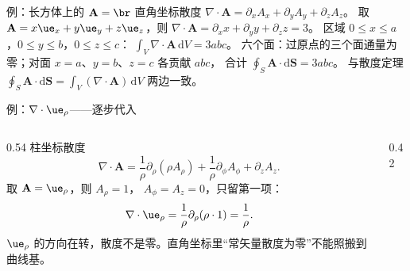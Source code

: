 \documentclass[fontset=windows, chinese, 10pt, xcolor=dvipsnames]{beamer}
\begin{document}
\begin{frame}{例：长方体上的 $\mathbf{A}=\br$}
  \small
  直角坐标散度
  $\nabla\cdot\mathbf{A}
  =\partial_x A_x+\partial_y A_y+\partial_z A_z$。
  取 $\mathbf{A}=x\ue_x+y\ue_y+z\ue_z$，则
  $\nabla\cdot\mathbf{A}
  =\partial_x x+\partial_y y+\partial_z z=3$。
  区域 $0\leq x\leq a$，$0\leq y\leq b$，$0\leq z\leq c$：
  $\int_V\nabla\cdot\mathbf{A}\,\mathrm{d}V=3abc$。
  六个面：过原点的三个面通量为零；对面 $x=a$、$y=b$、$z=c$ 各贡献 $abc$，
  合计 $\oint_S\mathbf{A}\cdot\mathrm{d}\mathbf{S}=3abc$。
  与散度定理
  $\oint_S\mathbf{A}\cdot\mathrm{d}\mathbf{S}
  =\int_V(\nabla\cdot\mathbf{A})\,\mathrm{d}V$ 两边一致。
\end{frame}

\begin{frame}{例：$\nabla\cdot\ue_{\rho}$——逐步代入}
  \begin{columns}[T]
    \begin{column}{0.54\textwidth}
      {\small
      柱坐标散度
      \begin{equation*}
        \nabla\cdot\mathbf{A}
        =\frac{1}{\rho}\partial_{\rho}(\rho A_{\rho})
          +\frac{1}{\rho}\partial_{\phi}A_{\phi}
          +\partial_z A_z.
      \end{equation*}
      取 $\mathbf{A}=\ue_{\rho}$，则 $A_{\rho}=1$，
      $A_{\phi}=A_z=0$，只留第一项：
      \begin{equation*}
        \nabla\cdot\ue_{\rho}
        =\frac{1}{\rho}\partial_{\rho}(\rho\cdot 1)
        =\frac{1}{\rho}.
      \end{equation*}
      $\ue_{\rho}$ 的方向在转，散度不是零。直角坐标里“常矢量散度为零”不能照搬到曲线基。}
    \end{column}
    \begin{column}{0.42\textwidth}
      \centering
      \vspace{1.2em}
      \scalebox{0.82}{}
    \end{column}
  \end{columns}
\end{frame}

\end{document}
